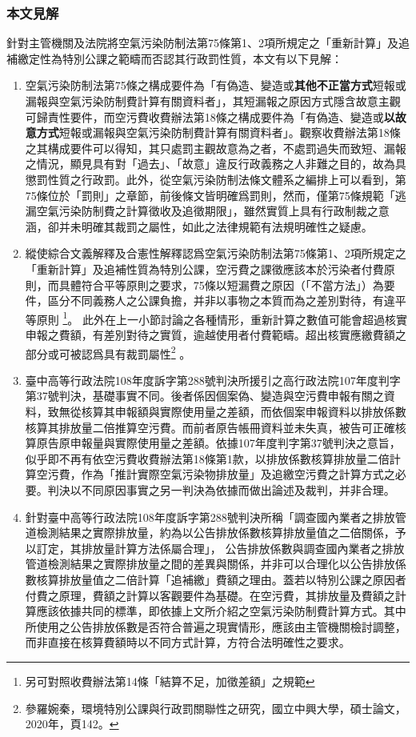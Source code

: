 \documentclass[11pt,a4paper]{article}
\begin{document}
\subsubsection{本文見解}
針對主管機關及法院將空氣污染防制法第75條第1、2項所規定之「重新計算」及追補繳定性為特別公課之範疇而否認其行政罰性質，本文有以下見解：
\begin{enumerate}
   \item 空氣污染防制法第75條之構成要件為「有偽造、變造或\textbf{其他不正當方式}短報或漏報與空氣污染防制費計算有關資料者」，其短漏報之原因方式隱含故意主觀可歸責性要件，而空污費收費辦法第18條之構成要件為「有偽造、變造或\textbf{以故意方式}短報或漏報與空氣污染防制費計算有關資料者」。觀察收費辦法第18條之其構成要件可以得知，其只處罰主觀故意為之者，不處罰過失而致短、漏報之情況，顯見具有對「過去」、「故意」違反行政義務之人非難之目的，故為具懲罰性質之行政罰。此外，從空氣污染防制法條文體系之編排上可以看到，第75條位於「罰則」之章節，前後條文皆明確爲罰則，然而，僅第75條規範「逃漏空氣污染防制費之計算徵收及追徵期限」，雖然實質上具有行政制裁之意涵，卻并未明確其裁罰之屬性，如此之法律規範有法規明確性之疑慮。
   \item 縱使綜合文義解釋及合憲性解釋認爲空氣污染防制法第75條第1、2項所規定之「重新計算」及追補性質為特別公課，空污費之課徵應該本於污染者付費原則，而具體符合平等原則之要求，75條以短漏費之原因（「不當方法」）為要件，區分不同義務人之公課負擔，并非以事物之本質而為之差別對待，有違平等原則
   \footnote{另可對照收費辦法第14條「結算不足，加徵差額」之規範}。
   此外在上一小節討論之各種情形，重新計算之數值可能會超過核實申報之費額，有差別對待之實質，逾越使用者付費範疇。超出核實應繳費額之部分或可被認爲具有裁罰屬性\footnote{參羅婉秦，環境特別公課與行政罰關聯性之研究，國立中興大學，碩士論文，2020年，頁142。}
   。
   \item 臺中高等行政法院108年度訴字第288號判決所援引之高行政法院107年度判字第37號判決，基礎事實不同。後者係因個案偽、變造與空污費申報有關之資料，致無從核算其申報額與實際使用量之差額，而依個案申報資料以排放係數核算其排放量二倍推算空污費。而前者原告帳冊資料並未失真，被告可正確核算原告原申報量與實際使用量之差額。依據107年度判字第37號判決之意旨，似乎即不再有依空污費收費辦法第18條第1款，以排放係數核算排放量二倍計算空污費，作為「推計實際空氣污染物排放量」及追繳空污費之計算方式之必要。判決以不同原因事實之另一判決為依據而做出論述及裁判，并非合理。
   \item 針對臺中高等行政法院108年度訴字第288號判決所稱「調查國內業者之排放管道檢測結果之實際排放量，約為以公告排放係數核算排放量值之二倍關係，予以訂定，其排放量計算方法係屬合理」，
   公告排放係數與調查國內業者之排放管道檢測結果之實際排放量之間的差異與關係，并非可以合理化以公告排放係數核算排放量值之二倍計算「追補繳」費額之理由。蓋若以特別公課之原因者付費之原理，費額之計算以客觀要件為基礎。在空污費，其排放量及費額之計算應該依據共同的標準，即依據上文所介紹之空氣污染防制費計算方式。其中所使用之公告排放係數是否符合普遍之現實情形，應該由主管機關檢討調整，而非直接在核算費額時以不同方式計算，方符合法明確性之要求。
\end{enumerate}
\end{document}
